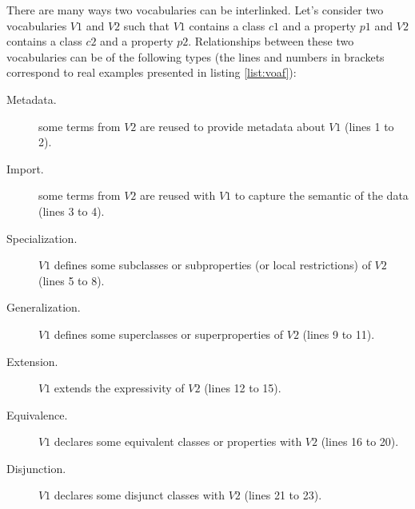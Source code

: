 \documentclass{iosart2c}
\begin{document}
There are many ways two vocabularies can be interlinked. Let's consider two vocabularies $V1$ and $V2$ such that $V1$ contains a class $c1$ and a property $p1$ and $V2$ contains a class $c2$ and a property $p2$. Relationships between these two vocabularies can be of the following types (the lines and numbers in brackets correspond to real examples presented in listing \ref{list:voaf}):
		\begin{description}
			\item [Metadata.] some terms from $V2$ are reused to provide metadata about $V1$ (lines 1 to 2).

			\item [Import.] some terms from $V2$ are reused with $V1$ to capture the semantic of the data (lines 3 to 4).

			\item [Specialization.] $V1$ defines some subclasses or subproperties (or local restrictions) of $V2$ (lines 5 to 8).

			\item [Generalization.] $V1$ defines some superclasses or superproperties of $V2$ (lines 9 to 11).

			\item [Extension.] $V1$ extends the expressivity of $V2$ (lines 12 to 15).

			\item [Equivalence.] $V1$ declares some equivalent classes or properties with $V2$ (lines 16 to 20).

			\item [Disjunction.] $V1$ declares some disjunct classes with $V2$ (lines 21 to 23).
		\end{description}
\end{document}
